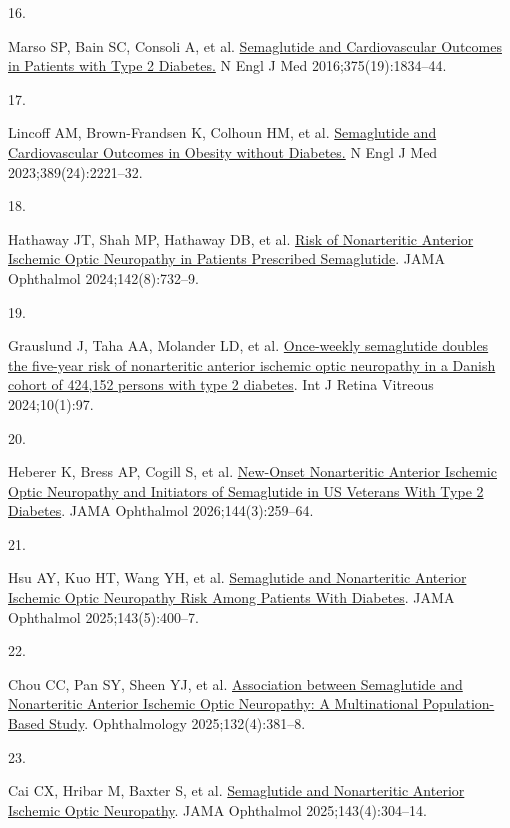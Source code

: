 \documentclass[
  11pt,
]{article}
\newlength{\cslhangindent}
\newlength{\csllabelwidth}
\newenvironment{CSLReferences}[2] %
 {\begin{list}{}{%
  \setlength{\itemindent}{0pt}
  \setlength{\leftmargin}{0pt}
  \setlength{\parsep}{0pt}
  \ifodd #1
   \setlength{\leftmargin}{\cslhangindent}
   \setlength{\itemindent}{-1\cslhangindent}
  \fi
  \setlength{\itemsep}{#2\baselineskip}}}
 {\end{list}}
\newcommand{\CSLLeftMargin}[1]{\parbox[t]{\csllabelwidth}{\strut#1\strut}}
\newcommand{\CSLRightInline}[1]{\parbox[t]{\linewidth - \csllabelwidth}{\strut#1\strut}}
\begin{document}
\begin{CSLReferences}{0}{1}
\CSLLeftMargin{16. }%
\CSLRightInline{Marso SP, Bain SC, Consoli A, et al.
\href{https://doi.org/10.1056/NEJMoa1607141}{{Semaglutide and
Cardiovascular Outcomes in Patients with Type 2 Diabetes.}} N Engl J Med
2016;375(19):1834--44. }

\CSLLeftMargin{17. }%
\CSLRightInline{Lincoff AM, Brown-Frandsen K, Colhoun HM, et al.
\href{https://doi.org/10.1056/NEJMoa2307563}{{Semaglutide and
Cardiovascular Outcomes in Obesity without Diabetes.}} N Engl J Med
2023;389(24):2221--32. }

\CSLLeftMargin{18. }%
\CSLRightInline{Hathaway JT, Shah MP, Hathaway DB, et al.
\href{https://doi.org/10.1001/jamaophthalmol.2024.2296}{{Risk of
Nonarteritic Anterior Ischemic Optic Neuropathy in Patients Prescribed
Semaglutide}}. JAMA Ophthalmol 2024;142(8):732--9. }

\CSLLeftMargin{19. }%
\CSLRightInline{Grauslund J, Taha AA, Molander LD, et al.
\href{https://doi.org/10.1186/s40942-024-00620-x}{{Once-weekly
semaglutide doubles the five-year risk of nonarteritic anterior ischemic
optic neuropathy in a Danish cohort of 424,152 persons with type 2
diabetes}}. Int J Retina Vitreous 2024;10(1):97. }

\CSLLeftMargin{20. }%
\CSLRightInline{Heberer K, Bress AP, Cogill S, et al.
\href{https://doi.org/10.1001/jamaophthalmol.2025.6262}{{New-Onset
Nonarteritic Anterior Ischemic Optic Neuropathy and Initiators of
Semaglutide in US Veterans With Type 2 Diabetes}}. JAMA Ophthalmol
2026;144(3):259--64. }

\CSLLeftMargin{21. }%
\CSLRightInline{Hsu AY, Kuo HT, Wang YH, et al.
\href{https://doi.org/10.1001/jamaophthalmol.2025.0349}{{Semaglutide and
Nonarteritic Anterior Ischemic Optic Neuropathy Risk Among Patients With
Diabetes}}. JAMA Ophthalmol 2025;143(5):400--7. }

\CSLLeftMargin{22. }%
\CSLRightInline{Chou CC, Pan SY, Sheen YJ, et al.
\href{https://doi.org/10.1016/j.ophtha.2024.10.030}{{Association between
Semaglutide and Nonarteritic Anterior Ischemic Optic Neuropathy: A
Multinational Population-Based Study}}. Ophthalmology
2025;132(4):381--8. }

\CSLLeftMargin{23. }%
\CSLRightInline{Cai CX, Hribar M, Baxter S, et al.
\href{https://doi.org/10.1001/jamaophthalmol.2024.6555}{{Semaglutide and
Nonarteritic Anterior Ischemic Optic Neuropathy}}. JAMA Ophthalmol
2025;143(4):304--14. }


\end{CSLReferences}
\end{document}
